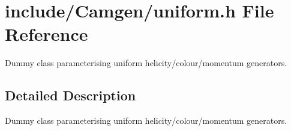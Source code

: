 \hypertarget{a00824}{}\section{include/\+Camgen/uniform.h File Reference}
\label{a00824}


Dummy class parameterising uniform helicity/colour/momentum generators.  




\subsection{Detailed Description}
Dummy class parameterising uniform helicity/colour/momentum generators. 

